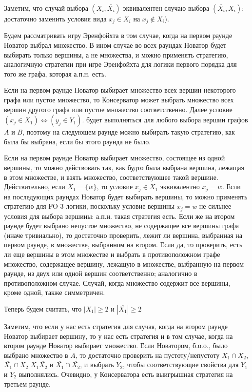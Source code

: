 \documentclass{article}
\begin{document}
	Заметим, что случай выбора $(X_i, \overline{X_i})$ эквивалентен случаю выбора $(\overline{X_i}, X_i)$: достаточно заменить условия вида $x_j \in X_i$ на $x_j \notin X_i$).
	
	Будем рассматривать игру Эренфойхта в том случае, когда на первом раунде Новатор выбрал множество. В ином случае во всех раундах Новатор будет выбирать только вершины, а не множества, и можно применять стратегию, аналогичную стратегии при игре Эренфойхта для логики первого порядка для того же графа, которая а.п.н. есть.
	
	Если на первом раунде Новатор выбирает множество всех вершин некоторого графа или пустое множество, то Консерватор может выбрать множество всех вершин другого графа или пустое множество соответственно. Далее условие $(x_j \in X_1) \Leftrightarrow (y_j \in Y_1).$ будет выполняться для любого выбора вершин графов $A$ и $B$, поэтому на следующем раунде можно выбирать такую стратегию, как была бы выбрана, если бы этого раунда не было.
	
	Если на первом раунде Новатор выбирает множество, состоящее из одной вершины, то можно действовать так, как будто была выбрана вершина, лежащая в этом множестве, и взять множество, соответствующее такой вершине. Действительно, если $X_1 = \{w\}$, то условие $x_j \in X_1$ эквивалентно $x_j = w$. Если на последующих раундах Новатор будет выбирать вершины, то можно применять стратегию для FO-3-логики, поскольку условие вершины $x_j = w$ не сильнее условия для выбора вершины: а.п.н. такая стратегия есть. Если же на втором раунде будет выбрано непустое множество, не содержащее все вершины графа (иначе тривиально), то достаточно проверить, лежит ли вершина, выбранная на первом раунде, в множестве, выбранном на втором. Если да, то проверить, есть ли еще вершины в этом множестве и выбрать в противоположном графе множество, содержащее вершину, лежащую в множестве, выбранную на первом раунде, из двух или одной вершин соответственно; аналогично в противоположном случае. Случай, когда множество содержит все вершины, кроме одной, также симметричен.
	
	Теперь будем считать, что $|X_1| \geq 2$ и $|\overline{X_1}| \geq 2$
	
	Заметим, что если у нас есть стратегия для случая, когда на втором раунде Новатор выбирает вершину, то у нас есть стратегия и в том случае, когда на втором раунде Новатор выбирает множество. Если Новатором, б.о.о., было выбрано множество в $A$, то достаточно проверить на пустоту/непустоту $X_1 \cap X_2$, $\overline{X_1} \cap X_2$ $X_1 \overline{X_2}$ и $\overline{X_1} \cap \overline{X_2}$, и выбрать $Y_2$, чтобы соответствующие свойства для $Y_1$ и $Y_2$ выполнялись. Очевидно, у Консерватора есть выигрышная стратегия на третьем раунде.
	
\end{document}
